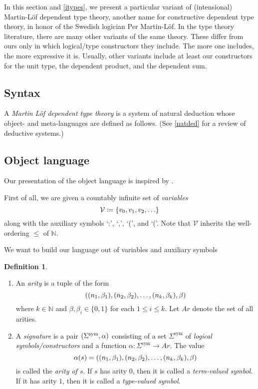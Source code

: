 \documentclass[10pt,letterpaper,cm]{nupset}
\theoremstyle{definition}
\newtheorem{definition}{Definition}[subsection]
\theoremstyle{theorem}
\theoremstyle{remark}
\DeclareMathOperator{\sym}{sym}
\newcommand{\0}{\mathbf{0}}
\newcommand{\1}{\mathbf{1}}
\newcommand{\2}{\mathbf{2}}
\newcommand{\N}{\mathbb N}
\newcommand{\be}{\begin{enumerate}}
\newcommand{\ee}{\end{enumerate}}
\begin{document}
In this section and \cref{itypes}, we present a particular variant of (intensional)  Martin-L\"of  dependent  type theory, another name for constructive dependent type theory, in honor of the Swedish logician Per Martin-L\"of. In the type theory literature, there are many other variants of the same theory. These differ from ours only in which logical/type constructors they include. The more one includes, the more expressive it is. Usually, other variants include  at least our constructors for the unit type, the dependent product, and the dependent sum.

\subsection{Syntax}

A \textit{Martin L\"of dependent type theory} is a system of natural deduction whose object- and meta-languages are defined as follows. (See \cref{natded} for a review of deductive systems.) 

\subsection*{Object language}

Our presentation of the object language is inspired by \cite{Gambino}.

\bigskip

First of all, we are given a countably infinite set of \textit{variables} $$\mathcal{V} \coloneqq \mleft\{v_0, v_1, v_2, \ldots \mright\}$$ along with the auxiliary symbols \lq{:}\rq,  \lq{,}\rq , \lq{(}\rq, and \lq{(}\rq.  Note that $\mathcal{V} $ inherits the well-ordering $\leq$ of $\N$.

\medskip

We want to build our language out of variables and auxiliary symbols

\begin{definition}\label{sig} $ $
\be
\item An \textit{arity} is a tuple of the form $$ \mleft(\mleft(n_{1}, \beta_{1}\mright),\mleft(n_{2}, \beta_{2}\mright), \ldots,\mleft(n_{k}, \beta_{k}\mright), \beta\mright)     $$ where $k\in \N$ and $\beta, \beta_i \in \{0,1\}$ for each $1\leq i \leq k$. Let $\mathit{Ar}$ denote the set of all arities. 
\item A \textit{signature} is a pair $\mleft(\Sigma^{\sym}, \alpha\mright)$ consisting of a set $\Sigma^{\sym}$ of \textit{logical symbols/constructors} and a function $\alpha : \Sigma^{\sym} \to \mathit{Ar}$. The value $$\alpha(s) = \mleft(\mleft(n_{1}, \beta_{1}\mright),\mleft(n_{2}, \beta_{2}\mright), \ldots,\mleft(n_{k}, \beta_{k}\mright), \beta\mright) $$ is called the \textit{arity of $s$}.  If $s$ has arity $0$, then it is called a \textit{term-valued symbol}. If it has arity $1$, then it is called a \textit{type-valued symbol}.
\ee
\end{definition}
\end{document}
